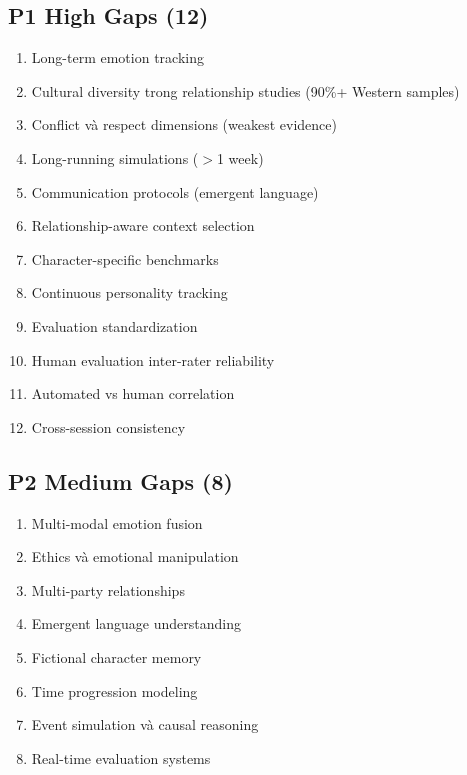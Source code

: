 \documentclass[10pt,leqno]{amsart}
\begin{document}
\subsection{P1 High Gaps (12)}

\begin{enumerate}
    \item Long-term emotion tracking
    \item Cultural diversity trong relationship studies (90\%+ Western samples)
    \item Conflict và respect dimensions (weakest evidence)
    \item Long-running simulations ($>$1 week)
    \item Communication protocols (emergent language)
    \item Relationship-aware context selection
    \item Character-specific benchmarks
    \item Continuous personality tracking
    \item Evaluation standardization
    \item Human evaluation inter-rater reliability
    \item Automated vs human correlation
    \item Cross-session consistency
\end{enumerate}

\subsection{P2 Medium Gaps (8)}

\begin{enumerate}
    \item Multi-modal emotion fusion
    \item Ethics và emotional manipulation
    \item Multi-party relationships
    \item Emergent language understanding
    \item Fictional character memory
    \item Time progression modeling
    \item Event simulation và causal reasoning
    \item Real-time evaluation systems
\end{enumerate}

\end{document}
